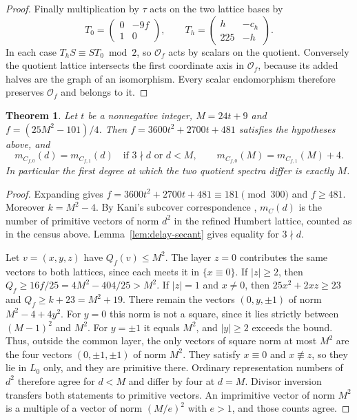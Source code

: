 \documentclass[11pt,letterpaper]{amsart}
\newtheorem{theorem}{Theorem}[section]
\theoremstyle{definition}
\numberwithin{equation}{section}
\newcommand{\OO}{\mathcal O}
\newcommand{\abs}[1]{\lvert #1\rvert}
\begin{document}
\begin{proof}
Finally multiplication by \(\tau\) acts on the two lattice bases by
\[
 T_0=\begin{pmatrix}0&-9f\\1&0\end{pmatrix},\qquad
 T_h=\begin{pmatrix}h&-c_h\\225&-h\end{pmatrix}.
\]
In each case \(T_hS\equiv ST_0\bmod2\), so \(\OO_f\) acts by scalars on
the quotient. Conversely the quotient lattice intersects the
first coordinate axis in \(\OO_f\), because its added halves are
the graph of an isomorphism. Every scalar endomorphism therefore
preserves \(\OO_f\) and belongs to it.
\end{proof}

\begin{theorem}\label{thm:delay}
Let \(t\) be a nonnegative integer, \(M=24t+9\) and \(f=(25M^2-101)/4\). Then
\(f=3600t^2+2700t+481\) satisfies the hypotheses above, and
\[
 m_{C_{f,0}}(d)=m_{C_{f,1}}(d)\quad\text{if }3\nmid d\text{ or }d<M,
 \qquad
 m_{C_{f,0}}(M)=m_{C_{f,1}}(M)+4 .
\]
In particular the first degree at which the two quotient spectra
differ is exactly \(M\).
\end{theorem}

\begin{proof}
Expanding gives \(f=3600t^2+2700t+481\equiv181\pmod{300}\) and
\(f\ge481\). Moreover \(k=M^2-4\). By Kani's subcover correspondence
\cite{KaniI}, \(m_C(d)\) is the number of primitive vectors of norm
\(d^2\) in the refined Humbert lattice, counted as in the census above.
Lemma~\ref{lem:delay-secant} gives equality for \(3\nmid d\).

Let \(v=(x,y,z)\) have \(Q_f(v)\le M^2\). The layer \(z=0\) contributes
the same vectors to both lattices, since each meets it in
\(\{x\equiv0\}\). If \(\abs z\ge2\), then
\(Q_f\ge16f/25=4M^2-404/25>M^2\). If \(\abs z=1\) and \(x\ne0\), then
\(25x^2+2xz\ge23\) and \(Q_f\ge k+23=M^2+19\). There remain the vectors
\((0,y,\pm1)\) of norm \(M^2-4+4y^2\). For \(y=0\) this norm is not a
square, since it lies strictly between \((M-1)^2\) and \(M^2\). For
\(y=\pm1\) it equals \(M^2\), and \(\abs y\ge2\) exceeds the bound. Thus,
outside the common layer, the only vectors of square norm at most \(M^2\)
are the four vectors \((0,\pm1,\pm1)\) of norm \(M^2\). They satisfy
\(x\equiv0\) and \(x\not\equiv z\), so they lie in \(L_0\) only, and they
are primitive there. Ordinary representation numbers of \(d^2\)
therefore agree for \(d<M\) and differ by four at \(d=M\). Divisor
inversion transfers both statements to primitive vectors. An
imprimitive vector of norm \(M^2\) is a multiple of a vector of norm
\((M/e)^2\) with \(e>1\), and those counts agree.
\end{proof}
\end{document}
